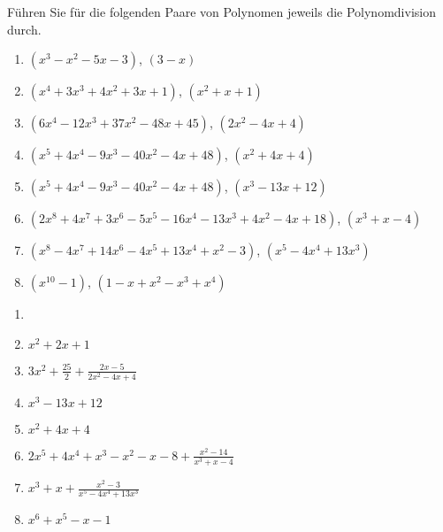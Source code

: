 \documentclass[12pt]{exam}
\begin{document}
\begin{questions}
Führen Sie für die folgenden Paare von Polynomen jeweils die Polynomdivision durch.
\begin{enumerate}
	\item $(x^3-x^2-5x-3)$, $(3-x)$
	\item $(x^4+3x^3+4x^2+3x+1)$, $(x^2+x+1)$
	\item $(6 x^4-12 x^3+37 x^2-48 x+45)$, $(2 x^2-4 x+4)$
	\item $(x^5+4 x^4-9 x^3-40 x^2-4 x+48)$, $(x^2+4x+4)$
	\item $(x^5+4 x^4-9 x^3-40 x^2-4 x+48)$, $(x^3-13 x+12)$
	\item $(2 x^8+4 x^7+3 x^6-5 x^5-16 x^4-13 x^3+4 x^2-4 x+18)$, $(x^3+x-4)$
	\item $(x^8-4 x^7+14 x^6-4 x^5+13 x^4+x^2-3)$, $(x^5-4 x^4+13 x^3)$
	\item $(x^{10}-1)$, $(1 - x + x^2 - x^3 + x^4)$
\end{enumerate}
\begin{solution}
	\begin{enumerate}
		\item {}\\
		\item $x^2+2x+1$
		\item $3x^2+\frac{25}{2}+\frac{2x-5}{2 x^2-4 x+4}$
		\item $x^3-13x+12$
		\item $x^2+4x+4$
		\item $2x^5+4x^4+x^3-x^2-x-8+\frac{x^2-14}{x^3+x-4}$
		\item $x^3+x+\frac{x^2-3}{x^5-4 x^4+13 x^3}$
		\item $x^6+x^5-x-1$
	\end{enumerate}
\end{solution}





\end{questions}
\end{document}
